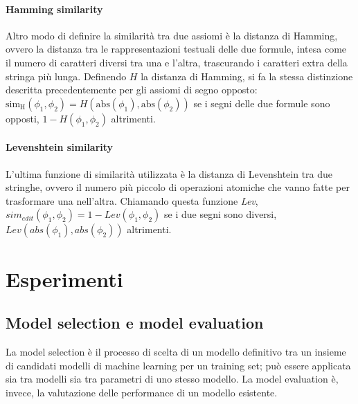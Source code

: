 \documentclass[12pt,a4paper]{report}
\begin{document}
\subsubsection{Hamming similarity}
\label{hammingSection}
Altro modo di definire la similarità tra due assiomi è la distanza di Hamming, ovvero la distanza tra le rappresentazioni testuali delle due formule, intesa come il numero di caratteri diversi tra una e l'altra, trascurando i caratteri extra della stringa più lunga.
Definendo $H$ la distanza di Hamming, si fa la stessa distinzione descritta precedentemente per gli assiomi di segno opposto:  $ \mathrm{sim_{H}}(\phi_1, \phi_2) = H(\mathrm{abs}(\phi_1),\mathrm{abs}(\phi_2))$ se i segni delle due formule sono opposti, $1 - H(\phi_1, \phi_2)$ altrimenti.

\subsubsection{Levenshtein similarity}
\label{levenshteinSection}
L'ultima funzione di similarità utilizzata è la distanza di Levenshtein tra due stringhe, ovvero il numero più piccolo di operazioni atomiche che vanno fatte per trasformare una nell'altra. Chiamando questa funzione \emph{Lev}, $sim_{edit}(\phi_1, \phi_2) = 1 - Lev(\phi_1,\phi_2)$ se i due segni sono diversi, $Lev(abs(\phi_1),abs(\phi_2))$ altrimenti.


\chapter{Esperimenti}\label{capitoloEsperimenti}

\section{Model selection e model evaluation}
La model selection è il processo di scelta di un modello definitivo tra un insieme di candidati modelli di machine learning per un training set; può essere applicata sia tra modelli sia tra parametri di uno stesso modello.
La model evaluation è, invece, la valutazione delle performance di un modello esistente.
\end{document}
